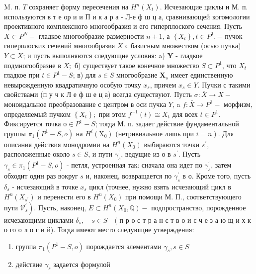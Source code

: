 \documentclass[10pt]{article}
\begin{document}
M. п. $T$ сохраняет форму пересечения на $H^{n}\left(X_{t}\right)$. Исчезающие циклы и М. п. используются в т е ор и и П и к а р а - Л-е ф ш ц а, сравнивающей когомологии проективного комплексного многообразия и его гиперплоского сечения. Пусть $X \subset P^{N}-$ гладкое многообразие размерности $n+1$, а $\left\{X_{t}\right\}, t \in P^{1},-$ пучок гиперплоских сечений многообразия $X$ с базисным множеством (осью пучка) $Y \subset X$; и пусть выполняются следующие условия: a) $\boldsymbol{Y}$ - гладкое подмногообразие в $X ;$ б) существует такое конечное множество $S \subset P^{1}$, что $X_{t}$ гладкое при $t \in P^{1}-S$; в) для $s \in S$ многообразие $\boldsymbol{X}_{s}$ имеет единственную невырожденную квадратичную особую точку $x_{s}$, причем $x_{s} \in Y$. Пучки с такими свойствами (п у ч к Л е ф ш е ц а) всегда существуют. Пусть $\sigma: \bar{X} \rightarrow X-$ моноидальное преобразование с центром в оси пучка $Y$, a $f: \bar{X} \rightarrow P^{1}-$ морфизм, определяемый пучком $\left\{X_{t}\right\} ;$ при этом $f^{-1}(t) \cong X_{t}$ для всех $t \in P^{1}$. Фиксируется точка $о \in P^{1}-S$; тогда М. п. задает действие фундаментальной группы $\pi_{1}\left(P^{1}-S, o\right)$ на $H^{i}\left(\mathrm{X}_{0}\right)$ (нетривиальное лишь при $\left.i=n\right)$. Для описания действия монодромии на $H^{n}\left(X_{0}\right)$ выбираются точки $s^{\prime}$, расположенные около $s \in S$, и пути $\gamma_{s}^{\prime}$, ведущие из $о$ в $s^{\prime}$. Пусть $\gamma_{s} \in \pi_{1}\left(P^{1}-S, o\right)$ - петля, устроенная так: сначала она идет по $\gamma_{s}^{\prime}$, затем обходит один раз вокруг $s$ и, наконец, возвращается по $\gamma_{s}^{\prime}$ в $о$. Кроме того, пусть $\delta_{s}$ - исчезающий в точке $x_{s}$ цикл (точнее, нужно взять исчезающий цикл в $H^{n}\left(X_{s^{\prime}}\right)$ и перенести его в $H^{n}\left(X_{0}\right)$ при помощи М. П., соответствующего пути $\left.\mathcal{V}_{s}^{\prime}\right)$. Пусть, наконец, $E \subset H^{n}\left(X_{0}, \mathbb{Q}\right)-$ подпространство, порожденное исчезающими циклами $\delta_{s}, \quad s \in S \quad($ п р о с т р а н с т в о и с ч е з а ю щ и х к о го о л о г и й). Тогда имеют место следующие утверждения:



\begin{enumerate}

  \item группа $\pi_{1}\left(P^{1}-S, o\right)$ порождается элементами $\gamma_{s}, s \in S$



  \item действие $\gamma_{s}$ задается формулой



\end{enumerate}
\end{document}
